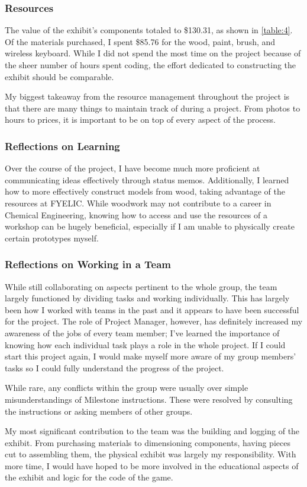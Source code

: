 \documentclass[conference]{IEEEtran}
\begin{document}
\subsubsection{Resources}

\par The value of the exhibit’s components totaled to \$130.31, as shown in \ref{table:4}. Of the materials purchased, I spent \$85.76 for the wood, paint, brush, and wireless keyboard.  While I did not spend the most time on the project because of the sheer number of hours spent coding, the effort dedicated to constructing the exhibit should be comparable.  
\par My biggest takeaway from the resource management throughout the project is that there are many things to maintain track of during a project.  From photos to hours to prices, it is important to be on top of every aspect of the process.

\subsubsection{Reflections on Learning}

\par Over the course of the project, I have become much more proficient at communicating ideas effectively through status memos.  Additionally, I learned how to more effectively construct models from wood, taking advantage of the resources at FYELIC.  While woodwork may not contribute to a career in Chemical Engineering, knowing how to access and use the resources of a workshop can be hugely beneficial, especially if I am unable to physically create certain prototypes myself.  

\subsubsection{Reflections on Working in a Team}

\par While still collaborating on aspects pertinent to the whole group, the team largely functioned by dividing tasks and working individually.  This has largely been how I worked with teams in the past and it appears to have been successful for the project.  The role of Project Manager, however, has definitely increased my awareness of the jobs of every team member; I’ve learned the importance of knowing how each individual task plays a role in the whole project.  If I could start this project again, I would make myself more aware of my group members’ tasks so I could fully understand the progress of the project.
 \par   While rare, any conflicts within the group were usually over simple misunderstandings of Milestone instructions.  These were resolved by consulting the instructions or asking members of other groups.  
 \par   My most significant contribution to the team was the building and logging of the exhibit.  From purchasing materials to dimensioning components, having pieces cut to assembling them, the physical exhibit was largely my responsibility.  With more time, I would have hoped to be more involved in the educational aspects of the exhibit and logic for the code of the game.
\end{document}
